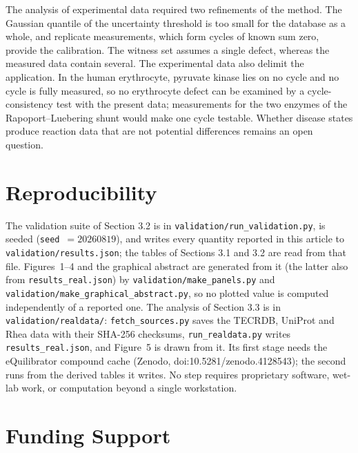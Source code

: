\documentclass[11pt,a4paper]{article}
\theoremstyle{pstyle}
\theoremstyle{definition}
\theoremstyle{remark}
\begin{document}
The analysis of experimental data required two refinements of the
method. The Gaussian quantile of the uncertainty threshold is too small
for the database as a whole, and replicate measurements, which form
cycles of known sum zero, provide the calibration. The witness set
assumes a single defect, whereas the measured data contain several. The
experimental data also delimit the application. In the human
erythrocyte, pyruvate kinase lies on no cycle and no cycle is fully
measured, so no erythrocyte defect can be examined by a
cycle-consistency test with the present data; measurements for the two
enzymes of the Rapoport--Luebering shunt would make one cycle testable.
Whether disease states produce reaction data that are not potential
differences remains an open question.

\section*{Reproducibility}

The validation suite of Section 3.2 is in
\texttt{validation/run\_validation.py}, is seeded
(\texttt{seed}~$=20260819$), and writes every quantity reported in this
article to \texttt{validation/results.json}; the tables of
Sections 3.1 and 3.2 are read from that file.
Figures~1--4 and the graphical abstract are generated from it (the
latter also from \texttt{results\_real.json}) by \texttt{validation/make\_panels.py} and
\texttt{validation/make\_graphical\_abstract.py}, so no plotted value is
computed independently of a reported one. The analysis of
Section 3.3 is in \texttt{validation/realdata/}:
\texttt{fetch\_sources.py} saves the TECRDB, UniProt and Rhea data with
their SHA-256 checksums, \texttt{run\_realdata.py} writes
\texttt{results\_real.json}, and Figure~5 is drawn from it. Its first
stage needs the eQuilibrator compound cache (Zenodo,
doi:10.5281/zenodo.4128543); the second runs from the derived tables it
writes. No step requires proprietary software, wet-lab work, or
computation beyond a single workstation.

\section*{Funding Support}
\end{document}
